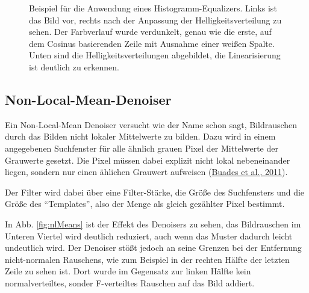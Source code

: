 \documentclass[
  12pt,
]{book}
\begin{document}
\begin{figure}
{}

\caption[Beispiel für die Anwendung eines Histogramm-Equalizers.]{Beispiel für die Anwendung eines Histogramm-Equalizers. Links ist das Bild vor, rechts nach der Anpassung der Helligkeitsverteilung zu sehen. Der Farbverlauf wurde verdunkelt, genau wie die erste, auf dem Cosinus basierenden Zeile mit Ausnahme einer weißen Spalte. Unten sind die Helligkeitsverteilungen abgebildet, die Linearisierung ist deutlich zu erkennen.}\label{fig:histEqual}
\end{figure}

\hypertarget{non-local-mean-denoiser}{%
\subsection{Non-Local-Mean-Denoiser}\label{non-local-mean-denoiser}}

Ein Non-Local-Mean Denoiser versucht wie der Name schon sagt, Bildrauschen durch das Bilden nicht lokaler Mittelwerte zu bilden. Dazu wird in einem angegebenen Suchfenster für alle ähnlich grauen Pixel der Mittelwerte der Grauwerte gesetzt. Die Pixel müssen dabei explizit nicht lokal nebeneinander liegen, sondern nur einen ählichen Grauwert aufweisen (\protect\hyperlink{ref-buadesNonLocalMeansDenoising2011}{Buades et al., 2011}).

Der Filter wird dabei über eine Filter-Stärke, die Größe des Suchfensters und die Größe des ``Templates'', also der Menge als gleich gezählter Pixel bestimmt.

In Abb. \ref{fig:nlMeans} ist der Effekt des Denoisers zu sehen, das Bildrauschen im Unteren Viertel wird deutlich reduziert, auch wenn das Muster dadurch leicht undeutlich wird. Der Denoiser stößt jedoch an seine Grenzen bei der Entfernung nicht-normalen Rauschens, wie zum Beispiel in der rechten Hälfte der letzten Zeile zu sehen ist. Dort wurde im Gegensatz zur linken Hälfte kein normalverteiltes, sonder F-verteiltes Rauschen auf das Bild addiert.
\end{document}
